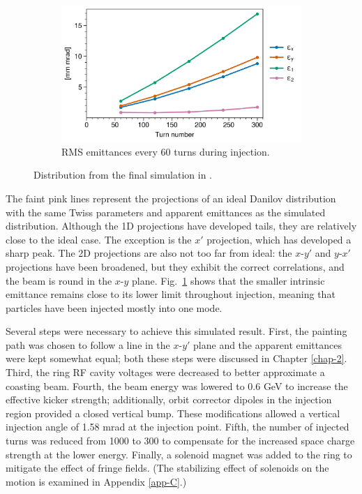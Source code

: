 \begin{figure}[!p]
\begin{subfigure}{0.5\textwidth}
        \includegraphics[width=\textwidth]{Images/chapter3/Holmes_emittances.png}
        \caption{RMS emittances every 60 turns during injection.}
        \label{fig:Holmes_emittances}
    \end{subfigure}
    \caption{Distribution from the final simulation in \cite{Holmes2018}.}
    \label{fig:Holmes}
\end{figure}
%
The faint pink lines represent the projections of an ideal Danilov distribution with the same Twiss parameters and apparent emittances as the simulated distribution. Although the 1D projections have developed tails, they are relatively close to the ideal case. The exception is the $x'$ projection, which has developed a sharp peak. The 2D projections are also not too far from ideal: the $x$-$y'$ and $y$-$x'$ projections have been broadened, but they exhibit the correct correlations, and the beam is round in the $x$-$y$ plane. Fig.~\ref{fig:Holmes_emittances} shows that the smaller intrinsic emittance remains close to its lower limit throughout injection, meaning that particles have been injected mostly into one mode. 

Several steps were necessary to achieve this simulated result. First, the painting path was chosen to follow a line in the $x$-$y'$ plane and the apparent emittances were kept somewhat equal; both these steps were discussed in Chapter \ref{chap-2}. Third, the ring RF cavity voltages were decreased to better approximate a coasting beam. Fourth, the beam energy was lowered to 0.6 GeV to increase the effective kicker strength; additionally, orbit corrector dipoles in the injection region provided a closed vertical bump. These modifications allowed a vertical injection angle of 1.58 mrad at the injection point. Fifth, the number of injected turns was reduced from 1000 to 300 to compensate for the increased space charge strength at the lower energy. Finally, a solenoid magnet was added to the ring to mitigate the effect of fringe fields. (The stabilizing effect of solenoids on the motion is examined in Appendix \ref{app-C}.)

